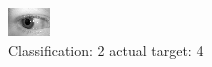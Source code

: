 \begin{figure}[h!]
\begin{center}
\includegraphics[width=0.60\columnwidth]{figures/ID823_class_2_target_4.png}
\end{center}
\caption{ Classification: 2 actual target: 4}
\label{fig:ID823_class_2_target_4}
\end{figure}
